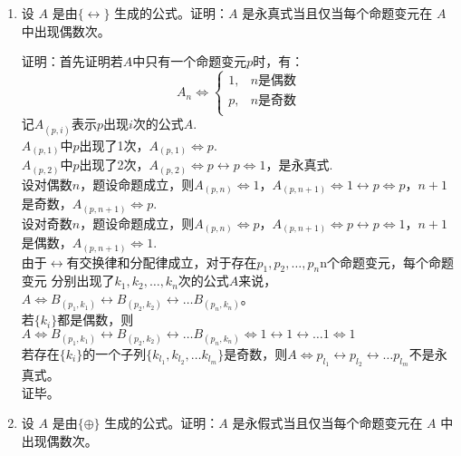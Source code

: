 \documentclass[UTF8]{ctexart}
\begin{document}
\begin{enumerate}
\begin{enumerate}
    \end{enumerate}
    \item 设 $A$ 是由$\{\leftrightarrow \}$ 生成的公式。证明：$A$ 是永真式当且仅当每个命题变元在 $A$ 中出现偶数次。
    
    证明：首先证明若$A$中只有一个命题变元$p$时，有：\\
    \[
        A_n\Leftrightarrow\begin{cases}
            1,&\text{$n$是偶数}\\
            p,&\text{$n$是奇数}\\
        \end{cases}
    \]
    记$A_{(p,i)}$表示$p$出现$i$次的公式$A$.\\
    $A_{(p,1)}$中$p$出现了1次，$A_{(p,1)}\Leftrightarrow p$.\\
    $A_{(p,2)}$中$p$出现了2次，$A_{(p,2)}\Leftrightarrow p\leftrightarrow p\Leftrightarrow 1$，是永真式.\\
    设对偶数$n$，题设命题成立，则$A_{(p,n)}\Leftrightarrow 1$，$A_{(p,n+1)}\Leftrightarrow 1\leftrightarrow p\Leftrightarrow p$，$n+1$是奇数，$A_{(p,n+1)}\Leftrightarrow p$.\\
    设对奇数$n$，题设命题成立，则$A_{(p,n)}\Leftrightarrow p$，$A_{(p,n+1)}\Leftrightarrow p\leftrightarrow p\Leftrightarrow 1$，$n+1$是偶数，$A_{(p,n+1)}\Leftrightarrow 1$.\\
    由于$\leftrightarrow$有交换律和分配律成立，对于存在$p_1,p_2,\dots,p_n$n个命题变元，每个命题变元
    分别出现了$k_1,k_2,\dots,k_n$次的公式$A$来说，$A\Leftrightarrow B_{(p_1,k_1)}\leftrightarrow B_{(p_2,k_2)} \leftrightarrow \dots B_{(p_n,k_n)}$。\\
    若$\{k_i\}$都是偶数，则$A\Leftrightarrow B_{(p_1,k_1)}\leftrightarrow B_{(p_2,k_2)} \leftrightarrow \dots B_{(p_n,k_n)}\Leftrightarrow 1\leftrightarrow 1\leftrightarrow \dots 1\Leftrightarrow 1$\\
    若存在$\{k_i\}$的一个子列$\{k_{l_1},k_{l_2},\dots k_{l_m}\}$是奇数，则$A\Leftrightarrow p_{l_1}\leftrightarrow p_{l_2}\leftrightarrow \dots p_{l_m}$不是永真式。\\
    证毕。

    \item 设 $A$ 是由$\{\oplus \}$ 生成的公式。证明：$A$ 是永假式当且仅当每个命题变元在 $A$ 中出现偶数次。
    

\end{enumerate}
\end{document}
